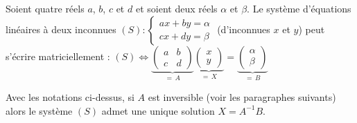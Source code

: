 	\begin{formula}
		Soient quatre réels $a$, $b$, $c$ et $d$ et soient deux réels $\alpha$ et $\beta$. Le système d'équations linéaires à deux inconnues $\displaystyle{(S) : \begin{cases}ax + by = \alpha \\ cx + dy = \beta\end{cases}}$ (d'inconnues $x$ et $y$) peut s'écrire matriciellement :
		\newpar
		$\displaystyle{(S) \iff \underbrace{\begin{pmatrix}a & b \\ c & d\end{pmatrix}}_{= \, A} \underbrace{\begin{pmatrix}x \\ y\end{pmatrix}}_{= \, X} = \underbrace{\begin{pmatrix}\alpha \\ \beta\end{pmatrix}}_{= \, B}}$
	\end{formula}

	\begin{formula}
		Avec les notations ci-dessus, si $A$ est inversible (voir les paragraphes suivants) alors le système $(S)$ admet une unique solution $X = A^{-1}B$.
	\end{formula}

